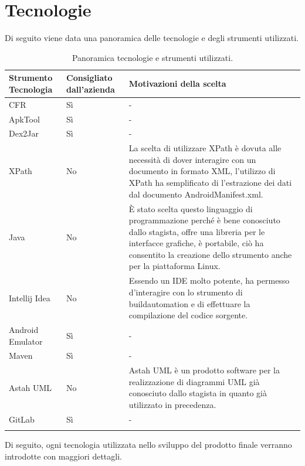 

\section{Tecnologie}\label{sec:tecnologie}
Di seguito viene data una panoramica delle tecnologie e degli strumenti utilizzati.
\begin{center}
    \begin{longtable}{ | C{3cm}| C{3cm} |C{7cm} |}
        \hline
        \textbf{Strumento Tecnologia} &
        \textbf{Consigliato dall'azienda}&
        \textbf{Motivazioni della scelta} \\\hline
        CFR & Sì & - \\\hline
        ApkTool& Sì & - \\\hline
        Dex2Jar& Sì & - \\\hline
        XPath& No & La scelta di utilizzare XPath è dovuta alle necessità di dover interagire con un documento in formato XML, l'utilizzo di XPath ha semplificato di l'estrazione dei dati dal documento AndroidManifest.xml.\\\hline
        Java& No & È stato scelta questo linguaggio di programmazione perché è bene conosciuto dallo stagista, offre una libreria per le interfacce grafiche, è portabile, ciò ha consentito la creazione dello strumento anche per la piattaforma Linux.\\\hline
        Intellij Idea& No & Essendo un IDE molto potente, ha permesso d'interagire con lo strumento di \gls{buildautomation} e di effettuare la compilazione del codice sorgente.\\\hline
        Android Emulator& Sì & - \\\hline
        Maven& Sì & - \\\hline
        Astah UML& No & Astah UML è un prodotto software per la realizzazione di diagrammi UML già conosciuto dallo stagista in quanto già utilizzato in precedenza.\\\hline
        GitLab& Sì & -\\\hline
        \caption{Panoramica tecnologie e strumenti utilizzati.}
    \end{longtable}
\end{center}

Di seguito, ogni tecnologia utilizzata nello sviluppo del prodotto finale verranno introdotte con maggiori dettagli.
